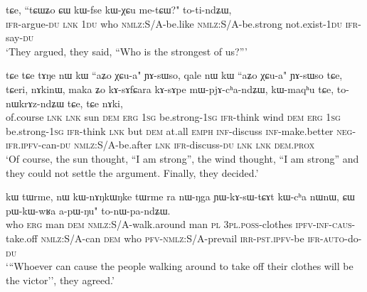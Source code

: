 \documentclass[12pt]{article}
\newcommand{\ipab}[1]{{\phon#1}}
\newcommand{\gltt}{ \vspace{-1em}  \glt}
\begin{document}
 \begin{myexe} 
\gll  \ipab{ɲɤ-sɤfɕɤra-ndʑɯ} \ipab{tɕe,} \ipab{``tɕɯʑo} \ipab{ɕɯ} \ipab{kɯ-fse} \ipab{kɯ-χɕu} \ipab{me-tɕɯ?"} \ipab{to-ti-ndʑɯ,} \\ 
 \textsc{ifr}-argue-\textsc{du}    \textsc{lnk}  1\textsc{du}     who \textsc{nmlz}:S/A-be.like \textsc{nmlz}:S/A-be.strong not.exist-1\textsc{du}  \textsc{ifr}-say-\textsc{du}\\ 
 \gltt  `They argued, they said, ``Who is the strongest of us?'''
\end{myexe} 

\begin{myexe} 
\gll  \ipab{lɯski} \ipab{tɕe} \ipab{tɕe} \ipab{tɤŋe} \ipab{nɯ} \ipab{kɯ} \ipab{``aʑo} \ipab{χɕu-a"} \ipab{ɲɤ-sɯso,} \ipab{qale} \ipab{nɯ} \ipab{kɯ} \ipab{``aʑo}  \ipab{χɕu-a"} \ipab{ɲɤ-sɯso} \ipab{tɕe,} \ipab{tɕeri,} \ipab{nɤkinɯ,} \ipab{maka} \ipab{ʑo} \ipab{kɤ-sɤfɕara} \ipab{kɤ-sɤpe} \ipab{mɯ-pjɤ-cʰa-ndʑɯ,} \ipab{kɯ-maqʰu} \ipab{tɕe,} \ipab{to-nɯkrɤz-ndʑɯ} \ipab{tɕe,} \ipab{tɕe} \ipab{nɤki,} \\ 
 of.course \textsc{lnk} \textsc{lnk} sun    \textsc{dem} \textsc{erg} 1\textsc{sg}  be.strong-1\textsc{sg} \textsc{ifr}-think wind \textsc{dem} \textsc{erg} 1\textsc{sg}  be.strong-1\textsc{sg} \textsc{ifr}-think \textsc{lnk}  but     \textsc{dem} at.all \textsc{emph} \textsc{inf}-discuss   \textsc{inf}-make.better  \textsc{neg}-\textsc{ifr}.\textsc{ipfv}-can-\textsc{du}    \textsc{nmlz}:S/A-be.after \textsc{lnk}  \textsc{ifr}-discuss-\textsc{du}    \textsc{lnk}  \textsc{lnk} \textsc{dem}.\textsc{prox}\\ 
 \gltt  `Of course, the sun thought, ``I am strong'', the wind thought, ``I am strong'' and they could not settle the argument. Finally, they decided.'
\end{myexe} 
 
\begin{myexe} 
\gll  \ipab{``ɕɯ} \ipab{kɯ} \ipab{tɯrme,} \ipab{nɯ} \ipab{kɯ-nɤŋkɯŋke} \ipab{tɯrme} \ipab{ra} \ipab{nɯ-ŋga} \ipab{ɲɯ-kɤ-sɯ-tɕɤt}  \ipab{kɯ-cʰa} \ipab{nɯnɯ,} \ipab{ɕɯ} \ipab{pɯ-kɯ-wʁa} \ipab{a-pɯ-ŋu"} \ipab{to-nɯ-pa-ndʑɯ.} \\ 
 who  \textsc{erg} man     \textsc{dem} \textsc{nmlz}:S/A-walk.around  man    \textsc{pl}  3\textsc{pl}.\textsc{poss}-clothes \textsc{ipfv}-\textsc{inf}-\textsc{caus}-take.off  \textsc{nmlz}:S/A-can  \textsc{dem}    who \textsc{pfv}-\textsc{nmlz}:S/A-prevail \textsc{irr}-\textsc{pst}.\textsc{ipfv}-be   \textsc{ifr}-\textsc{auto}-do-\textsc{du}\\ 
 \gltt  `{``}Whoever can cause the people walking around to take off their clothes will be the victor'', they agreed.'
\end{myexe} 
\end{document}
